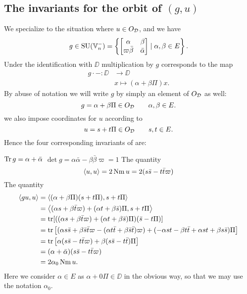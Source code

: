 \subsection{The invariants for the orbit of $(g,u)$}
We specialize to the situation where $u \in O_\mathcal D$, and we have
\[ g \in \operatorname{SU}(\mathbb V_n^-) = \left\{
    \begin{bmatrix} \alpha & \beta \\ \varpi\bar\beta & \bar\alpha \end{bmatrix}
    \mid \alpha, \beta \in E \right\}. \]
Under the identification with $\DD$ multiplication by $g$ corresponds to the map
\begin{align*}
  g \cdot - \colon \DD &\to \DD \\
  & x \mapsto (\alpha + \beta \Pi) x.
\end{align*}
By abuse of notation we will write $g$ by simply an element of $O_\mathcal D$ as well:
\[ g = \alpha + \beta \Pi \in O_\mathcal D \qquad \alpha, \beta \in E. \]
we also impose coordinates for $u$ according to
\[ u = s + t \Pi \in O_\mathcal D \qquad s, t \in E. \]
Hence the four corresponding invariants of  are:
\begin{itemize}
  \ii $\operatorname{Tr} g = \alpha + \bar\alpha$
  \ii $\det g = \alpha \bar \alpha - \beta \bar\beta \varpi = 1$
  \ii The quantity
  \[ \left\langle u,u \right\rangle = 2 \operatorname{Nm} u = 2(s \bar s - t \bar t \varpi) \]
  \ii The quantity
  \begin{align*}
    \left\langle gu, u \right\rangle
    &= \left\langle (\alpha + \beta \Pi)(s + t \Pi), s + t \Pi \right\rangle \\
    &= \left\langle (\alpha s + \beta \bar t \varpi) + (\alpha t + \beta \bar s) \Pi,
      s + t \Pi \right\rangle \\
    &= \operatorname{tr} [((\alpha s + \beta \bar t \varpi) + (\alpha t + \beta \bar s) \Pi) (\bar s - t \Pi)] \\
    &= \operatorname{tr}\left[
      (\alpha s \bar s + \beta \bar s \bar t \varpi
      - (\alpha t \bar t + \beta \bar s \bar t) \varpi)
      + (-\alpha s t - \beta t \bar t + \alpha s t + \beta s \bar s) \Pi
    \right] \\
    &= \operatorname{tr}\left[
      \alpha (s \bar s - t \bar t \varpi)
      + \beta(s \bar s - t \bar t) \Pi
    \right] \\
    &= (\alpha + \bar\alpha) (s \bar s - t \bar t \varpi) \\
    &= 2\alpha_0 \operatorname{Nm} u.
  \end{align*}
  Here we consider $\alpha \in E$ as $\alpha + 0 \Pi \in \DD$ in the obvious way,
  so that we may use the notation $\alpha_0$.
\end{itemize}
